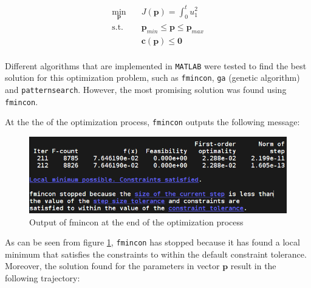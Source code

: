 \documentclass{thesisreport}
\begin{document}
\begin{equation}\label{parameter_optimization_problem}
\begin{aligned}
            \min_{\bm{p}} \quad & J(\bm{p}) = \int_0^t u_1^2 \\
            \textrm{s.t.} \quad & \bm{p}_{min} \leq \bm{p} \leq \bm{p}_{max} \\
            & \bm{c}(\bm{p}) \leq \bm{0} \\
        \end{aligned}
\end{equation}

Different algorithms that are implemented in \texttt{MATLAB} were tested to find the best solution for this optimization problem, such as \texttt{fmincon}, \texttt{ga} (genetic algorithm) and \texttt{patternsearch}. However, the most promising solution was found using \texttt{fmincon}.

\newpage

At the the of the optimization process, \texttt{fmincon} outputs the following message:

\begin{figure}[h]
	\centering
	\includegraphics[width=.7\textwidth]{Images/optimization/fmincon.png}
	\caption{Output of fmincon at the end of the optimization process}
	\label{fmincon_output}
\end{figure}

As can be seen from figure \ref{fmincon_output}, \texttt{fmincon} has stopped because it has found a local minimum that satisfies the constraints to within the default constraint tolerance. Moreover, the solution found for the parameters in vector $\bm{p}$ result in the following trajectory:
\end{document}

